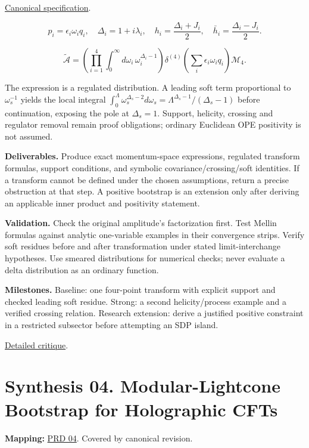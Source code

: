 \documentclass[
  11pt,
]{article}
\begin{document}
\href{https://github.com/rick-stevens-ai/Pure-Thought/blob/main/PRDs/03-Celestial-CFT-Bootstrap.md}{Canonical
specification}.

\[p_i=\epsilon_i\omega_i q_i,\quad
\Delta_i=1+i\lambda_i,\quad
h_i=\frac{\Delta_i+J_i}{2},\quad
\bar h_i=\frac{\Delta_i-J_i}{2}.\]

\[\widetilde{\mathcal A}=
\left(\prod_{i=1}^4\int_0^\infty d\omega_i\,\omega_i^{\Delta_i-1}\right)
\delta^{(4)}\!\left(\sum_i\epsilon_i\omega_iq_i\right)\mathcal M_4.\]

The expression is a regulated distribution. A leading soft term
proportional to \(\omega_s^{-1}\) yields the local integral
\(\int_0^\Lambda\omega_s^{\Delta_s-2}d\omega_s=\Lambda^{\Delta_s-1}/(\Delta_s-1)\)
before continuation, exposing the pole at \(\Delta_s=1\). Support,
helicity, crossing and regulator removal remain proof obligations;
ordinary Euclidean OPE positivity is not assumed.

\textbf{Deliverables.} Produce exact momentum-space expressions,
regulated transform formulas, support conditions, and symbolic
covariance/crossing/soft identities. If a transform cannot be defined
under the chosen assumptions, return a precise obstruction at that step.
A positive bootstrap is an extension only after deriving an applicable
inner product and positivity statement.

\textbf{Validation.} Check the original amplitude's factorization first.
Test Mellin formulas against analytic one-variable examples in their
convergence strips. Verify soft residues before and after transformation
under stated limit-interchange hypotheses. Use smeared distributions for
numerical checks; never evaluate a delta distribution as an ordinary
function.

\textbf{Milestones.} Baseline: one four-point transform with explicit
support and checked leading soft residue. Strong: a second
helicity/process example and a verified crossing relation. Research
extension: derive a justified positive constraint in a restricted
subsector before attempting an SDP island.

\href{https://github.com/rick-stevens-ai/Pure-Thought/blob/main/reviews/03-Celestial-CFT-Bootstrap.md}{Detailed
critique}.

\section{Synthesis 04. Modular-Lightcone Bootstrap for Holographic CFTs}

\textbf{Mapping:}
\href{https://github.com/rick-stevens-ai/Pure-Thought/blob/main/PRDs/04-Modular-Lightcone-Bootstrap.md}{PRD
04}. Covered by canonical revision.
\end{document}
